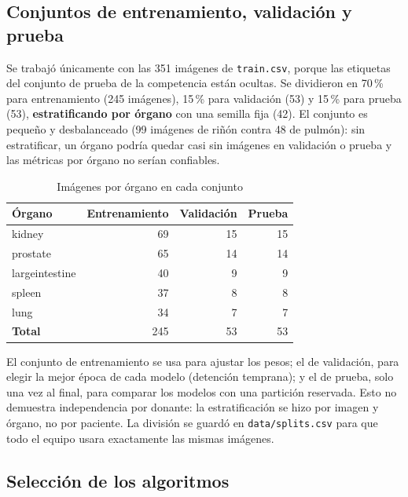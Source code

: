 \documentclass[11pt,letterpaper]{article}
\begin{document}
\subsection{Conjuntos de entrenamiento, validación y prueba}

Se trabajó únicamente con las 351 imágenes de \texttt{train.csv}, porque las etiquetas del conjunto de
prueba de la competencia están ocultas. Se dividieron en 70\,\% para entrenamiento (245 imágenes),
15\,\% para validación (53) y 15\,\% para prueba (53), \textbf{estratificando por órgano} con una
semilla fija (42). El conjunto es pequeño y desbalanceado (99 imágenes de riñón contra 48 de pulmón):
sin estratificar, un órgano podría quedar casi sin imágenes en validación o prueba y las métricas por
órgano no serían confiables.

\begin{table}[H]
\centering
\caption{Imágenes por órgano en cada conjunto}
\begin{tabular}{lrrr}
\toprule
\textbf{Órgano} & \textbf{Entrenamiento} & \textbf{Validación} & \textbf{Prueba} \\
\midrule
kidney         & 69 & 15 & 15 \\
prostate       & 65 & 14 & 14 \\
largeintestine & 40 &  9 &  9 \\
spleen         & 37 &  8 &  8 \\
lung           & 34 &  7 &  7 \\
\midrule
\textbf{Total} & 245 & 53 & 53 \\
\bottomrule
\end{tabular}
\end{table}

El conjunto de entrenamiento se usa para ajustar los pesos; el de validación, para elegir la mejor
época de cada modelo (detención temprana); y el de prueba, solo una vez al final, para comparar los
modelos con una partición reservada. Esto no demuestra independencia por donante: la estratificación
se hizo por imagen y órgano, no por paciente. La división se guardó en \texttt{data/splits.csv} para que todo el equipo usara
exactamente las mismas imágenes.

\subsection{Selección de los algoritmos}
\end{document}
